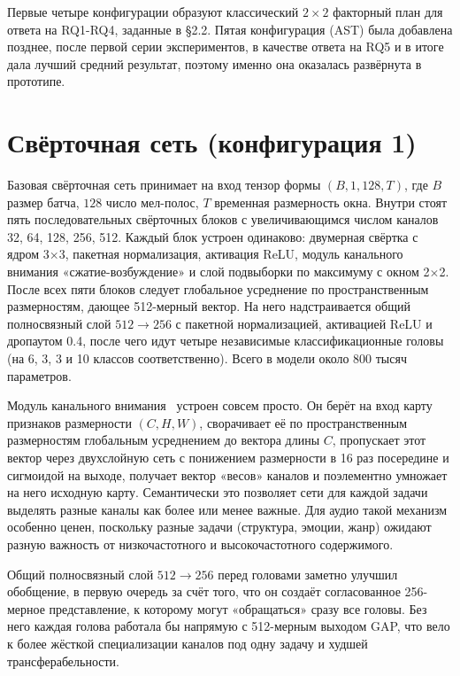 Первые четыре конфигурации образуют классический $2 \times 2$ факторный план для ответа на RQ1-RQ4, заданные в §2.2. Пятая конфигурация (AST) была добавлена позднее, после первой серии экспериментов, в качестве ответа на RQ5 и в итоге дала лучший средний результат, поэтому именно она оказалась развёрнута в прототипе.

\section{Свёрточная сеть (конфигурация 1)}\label{sec:4-2}

Базовая свёрточная сеть принимает на вход тензор формы $(B, 1, 128, T)$, где $B$ размер батча, $128$ число мел-полос, $T$ временная размерность окна. Внутри стоят пять последовательных свёрточных блоков с увеличивающимся числом каналов 32, 64, 128, 256, 512. Каждый блок устроен одинаково: двумерная свёртка с ядром 3$\times$3, пакетная нормализация, активация ReLU, модуль канального внимания «сжатие-возбуждение» и слой подвыборки по максимуму с окном 2$\times$2. После всех пяти блоков следует глобальное усреднение по пространственным размерностям, дающее 512-мерный вектор. На него надстраивается общий полносвязный слой $512 \to 256$ с пакетной нормализацией, активацией ReLU и дропаутом 0.4, после чего идут четыре независимые классификационные головы (на 6, 3, 3 и 10 классов соответственно). Всего в модели около 800 тысяч параметров.

Модуль канального внимания~\cite{hu2018se} устроен совсем просто. Он берёт на вход карту признаков размерности $(C, H, W)$, сворачивает её по пространственным размерностям глобальным усреднением до вектора длины $C$, пропускает этот вектор через двухслойную сеть с понижением размерности в 16 раз посередине и сигмоидой на выходе, получает вектор «весов» каналов и поэлементно умножает на него исходную карту. Семантически это позволяет сети для каждой задачи выделять разные каналы как более или менее важные. Для аудио такой механизм особенно ценен, поскольку разные задачи (структура, эмоции, жанр) ожидают разную важность от низкочастотного и высокочастотного содержимого.

Общий полносвязный слой $512 \to 256$ перед головами заметно улучшил обобщение, в первую очередь за счёт того, что он создаёт согласованное 256-мерное представление, к которому могут «обращаться» сразу все головы. Без него каждая голова работала бы напрямую с 512-мерным выходом GAP, что вело к более жёсткой специализации каналов под одну задачу и худшей трансферабельности.

